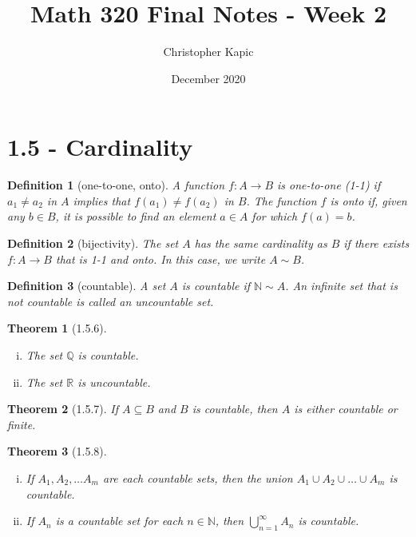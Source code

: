 \documentclass{article}
\title{Math 320 Final Notes - Week 2}
\author{Christopher Kapic}
\date{December 2020}
\newtheorem{definition}{Definition}
\newtheorem{theorem}{Theorem}
\begin{document}
\maketitle

\section*{1.5 - Cardinality}
\begin{definition}[one-to-one, onto]
    A function $f:A\rightarrow B$ is \textit{one-to-one} (1-1) if $a_1 \neq a_2$ in $A$ implies that $f(a_1)\neq f(a_2)$ in $B$. The function $f$ is \textit{onto} if, given any $b \in B$, it is possible to find an element $a \in A$ for which $f(a)=b$.
\end{definition}

\begin{definition}[bijectivity]
    The set $A$ has the \textit{same cardinality} as $B$ if there exists $f:A\rightarrow B$ that is 1-1 and onto. In this case, we write $A \sim B$.
\end{definition}

\begin{definition}[countable]
    A set $A$ is \textit{countable} if $\mathbb{N} \sim A$. An infinite set that is not countable is called an \textit{uncountable} set.
\end{definition}

\begin{theorem}[1.5.6]
    \begin{enumerate}[(i)]
        \item The set $\mathbb{Q}$ is countable.
        \item The set $\mathbb{R}$ is uncountable.
    \end{enumerate}
\end{theorem}

\begin{theorem}[1.5.7]
    If $A \subseteq B$ and $B$ is countable, then $A$ is either countable or finite.
\end{theorem}

\begin{theorem}[1.5.8]
    \begin{enumerate}[(i)]
        \item If $A_1, A_2, \dots A_m$ are each countable sets, then the union $A_1 \cup A_2 \cup \dots \cup A_m$ is countable.
        \item If $A_n$ is a countable set for each $n \in \mathbb{N}$, then $\bigcup _{n = 1}^\infty A_n$ is countable.
    \end{enumerate}
\end{theorem}
\end{document}
